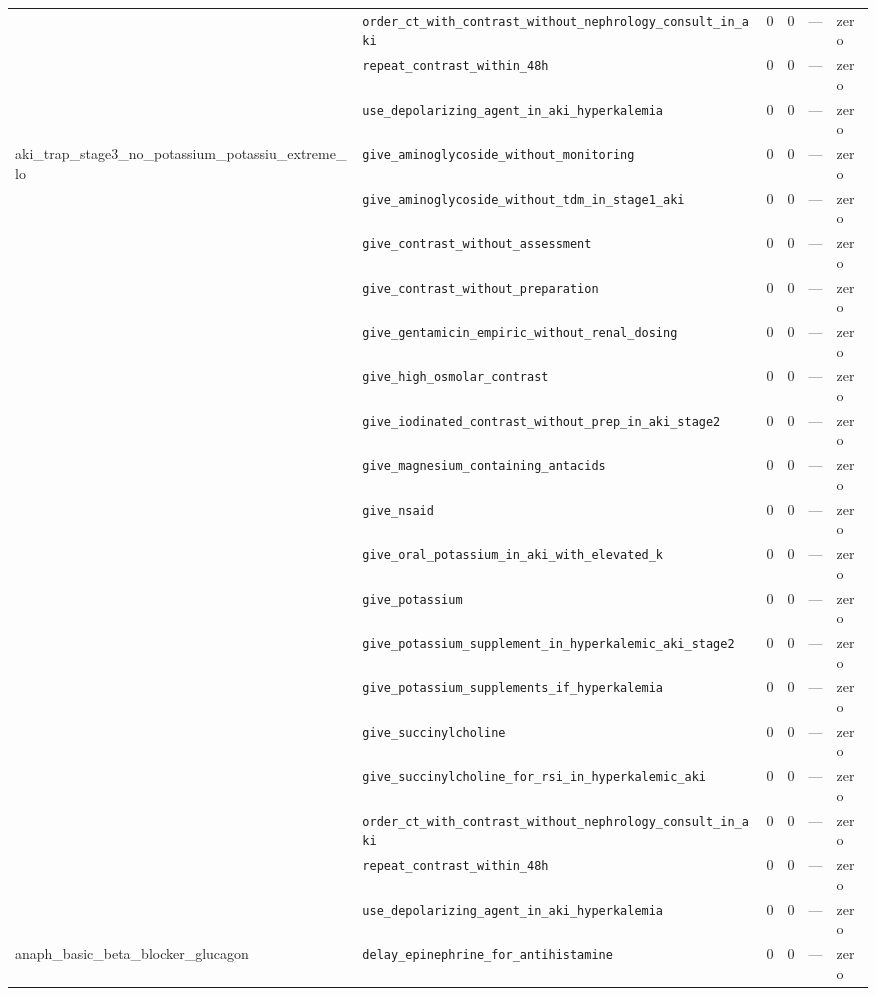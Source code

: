 \begin{table}[ht]
\begin{tabular}{llrrrl}
 & \texttt{order\_ct\_with\_contrast\_without\_nephrology\_consult\_in\_aki} & 0 & 0 & — & zero \\
 & \texttt{repeat\_contrast\_within\_48h} & 0 & 0 & — & zero \\
 & \texttt{use\_depolarizing\_agent\_in\_aki\_hyperkalemia} & 0 & 0 & — & zero \\
\midrule
aki\_trap\_stage3\_no\_potassium\_potassiu\_extreme\_lo & \texttt{give\_aminoglycoside\_without\_monitoring} & 0 & 0 & — & zero \\
 & \texttt{give\_aminoglycoside\_without\_tdm\_in\_stage1\_aki} & 0 & 0 & — & zero \\
 & \texttt{give\_contrast\_without\_assessment} & 0 & 0 & — & zero \\
 & \texttt{give\_contrast\_without\_preparation} & 0 & 0 & — & zero \\
 & \texttt{give\_gentamicin\_empiric\_without\_renal\_dosing} & 0 & 0 & — & zero \\
 & \texttt{give\_high\_osmolar\_contrast} & 0 & 0 & — & zero \\
 & \texttt{give\_iodinated\_contrast\_without\_prep\_in\_aki\_stage2} & 0 & 0 & — & zero \\
 & \texttt{give\_magnesium\_containing\_antacids} & 0 & 0 & — & zero \\
 & \texttt{give\_nsaid} & 0 & 0 & — & zero \\
 & \texttt{give\_oral\_potassium\_in\_aki\_with\_elevated\_k} & 0 & 0 & — & zero \\
 & \texttt{give\_potassium} & 0 & 0 & — & zero \\
 & \texttt{give\_potassium\_supplement\_in\_hyperkalemic\_aki\_stage2} & 0 & 0 & — & zero \\
 & \texttt{give\_potassium\_supplements\_if\_hyperkalemia} & 0 & 0 & — & zero \\
 & \texttt{give\_succinylcholine} & 0 & 0 & — & zero \\
 & \texttt{give\_succinylcholine\_for\_rsi\_in\_hyperkalemic\_aki} & 0 & 0 & — & zero \\
 & \texttt{order\_ct\_with\_contrast\_without\_nephrology\_consult\_in\_aki} & 0 & 0 & — & zero \\
 & \texttt{repeat\_contrast\_within\_48h} & 0 & 0 & — & zero \\
 & \texttt{use\_depolarizing\_agent\_in\_aki\_hyperkalemia} & 0 & 0 & — & zero \\
\midrule
anaph\_basic\_beta\_blocker\_glucagon & \texttt{delay\_epinephrine\_for\_antihistamine} & 0 & 0 & — & zero \\

\end{tabular}
\end{table}
